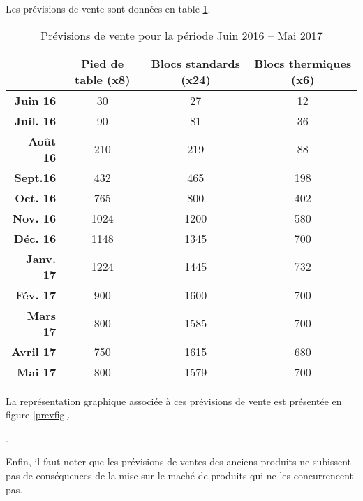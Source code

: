Les prévisions de vente sont données en table \ref{prevVente}.
\begin{table}[!ht]
	\centering
	\begin{tabular}{>{\bfseries}rccc}
		\toprule
		& \textbf{Pied de table (x8)} & \textbf{Blocs standards (x24)} &
		\textbf{Blocs
		thermiques (x6)} \\
		\midrule
		Juin 16 & 30 & 27 & 12\\
		Juil. 16 & 90 & 81 & 36\\
		Août 16 & 210 & 219 & 88\\
		Sept.16 & 432 & 465 & 198 \\
		Oct. 16 & 765 & 800 & 402\\
		Nov. 16 & 1024 & 1200 & 580 \\
		Déc. 16 & 1148 & 1345 & 700 \\
		Janv. 17 & 1224 & 1445 & 732\\
		Fév. 17 & 900 & 1600 & 700\\
		Mars 17 & 800 & 1585 & 700\\
		Avril 17 & 750 & 1615 & 680\\
		Mai 17 & 800 & 1579 & 700\\
		\bottomrule
	\end{tabular}
	\caption{Prévisions de vente pour la période Juin 2016 -- Mai
	2017\label{prevVente}}
\end{table}

La représentation graphique associée à ces prévisions de vente est
présentée en figure \ref{prevfig}.

.

Enfin, il faut noter que les prévisions de ventes des anciens produits
ne subissent pas de conséquences de la mise sur le maché de produits qui
ne les concurrencent pas.
